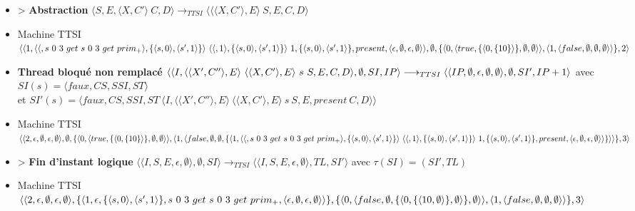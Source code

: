 \documentclass[10pt,a4paper]{article}
\begin{document}
\begin{itemize}
					\item[] > \textbf{Abstraction} $\langle S,E,\langle X,C'\rangle~C,D\rangle
					\longrightarrow_{TTSI} 
					\langle \langle\langle X,C'\rangle,E\rangle~S,E,C,D\rangle$
					\item[] Machine TTSI $\langle\langle 1,\langle\langle,s~0~3~get~s~0~3~get~prim_{+}\rangle,\{\langle s,0\rangle,\langle s',1\rangle\}\rangle~\langle\langle,1\rangle,\{\langle s,0\rangle,\langle s',1\rangle\}\rangle~1,\{\langle s,0\rangle,\langle s',1\rangle\},present ,\langle\epsilon,\emptyset,\epsilon,\emptyset\rangle\rangle,\\\emptyset,\{\langle 0,\langle true,\{\langle 0,\{10\}\rangle\},\emptyset,\emptyset\rangle\rangle,\langle 1,\langle false,\emptyset,\emptyset,\emptyset\rangle\rangle\},2\rangle$
					\item[] \textbf{Thread bloqué non remplacé } $\langle\langle I,\langle\langle X',C''\rangle,E\rangle~\langle\langle X,C'\rangle,E\rangle~s~S,E,C,D\rangle,\emptyset,SI,IP\rangle 
					\longrightarrow_{TTSI} 
					\\\langle\langle IP,\emptyset,\epsilon,\emptyset,\emptyset\rangle,\emptyset,SI',IP+1\rangle$
					avec $SI(s) = \langle faux,CS,SSI,ST\rangle$
					\\et $SI'(s) = \langle faux,CS,SSI,ST~\langle I,\langle\langle X',C''\rangle,E\rangle~\langle\langle X,C'\rangle,E\rangle~s~S,E,present~C,D\rangle\rangle$
					\item[] Machine TTSI $\langle\langle 2,\epsilon,\emptyset,\epsilon,\emptyset\rangle,\emptyset,\{\langle 0,\langle true,\{\langle 0,\{10\}\rangle\},\emptyset,\emptyset\rangle\rangle,\langle 1,\langle false,\emptyset,\emptyset,\{\langle 1,\langle\langle,s~0~3~get~s~0~3~get~prim_{+}\rangle,\\\{\langle s,0\rangle,\langle s',1\rangle\}\rangle~\langle\langle,1\rangle, \{\langle s,0\rangle,\langle s',1\rangle\}\rangle~1,\{\langle s,0\rangle,\langle s',1\rangle\},present ,\langle\epsilon,\emptyset,\epsilon,\emptyset\rangle\rangle\}\rangle\rangle\},3\rangle$
					\item[] > \textbf{Fin d'instant logique} $\langle\langle I,S,E,\epsilon,\emptyset \rangle ,\emptyset,SI\rangle 
					\longrightarrow_{TTSI} 
					\langle\langle I,S,E,\epsilon,\emptyset\rangle,TL,SI'\rangle$
					avec $\tau(SI) = (SI',TL)$
					\item[] Machine TTSI $\langle\langle 2,\epsilon,\emptyset,\epsilon,\emptyset\rangle,\{\langle 1,\epsilon,\{\langle s,0\rangle,\langle s',1\rangle\},s~0~3~get~s~0~3~get~prim_{+} ,\langle\epsilon,\emptyset,\epsilon,\emptyset\rangle\rangle\},\\\{\langle 0,\langle false,\emptyset,\{\langle 0,\{\langle 10,\emptyset\rangle\},\emptyset\rangle\},\emptyset\rangle\rangle,\langle 1,\langle false,\emptyset,\emptyset,\emptyset\rangle\rangle\},3\rangle$ 

\end{itemize}
\end{document}
